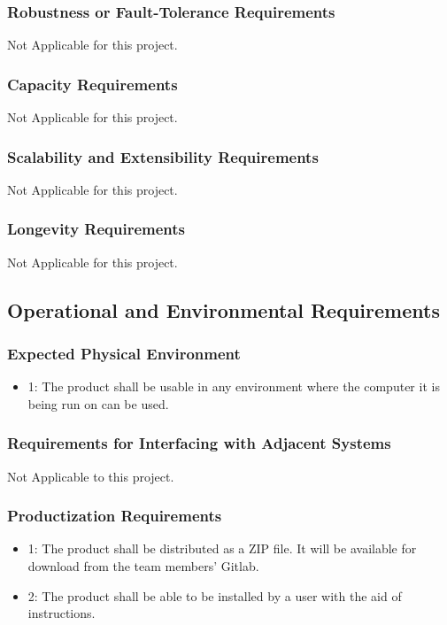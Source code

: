 \documentclass[12pt]{article}
\begin{document}
\subsubsection*{Robustness or Fault-Tolerance Requirements}
Not Applicable for this project.
\subsubsection*{Capacity Requirements}
Not Applicable for this project.
\subsubsection*{Scalability and Extensibility Requirements}
Not Applicable for this project.
\subsubsection*{Longevity Requirements}
Not Applicable for this project.

\subsection{Operational and Environmental Requirements}

\subsubsection*{Expected Physical Environment}
\begin{itemize}
\item 1: The product shall be usable in any environment where the computer it is being run on can be used.
\end{itemize}

\subsubsection*{Requirements for Interfacing with Adjacent Systems}
Not Applicable to this project.

\subsubsection*{Productization Requirements}
\begin{itemize}
\item 1: The product shall be distributed as a ZIP file. It will be available for download from the team members' Gitlab.
\item 2: The product shall be able to be installed by a user with the aid of instructions.
\end{itemize}
\end{document}
